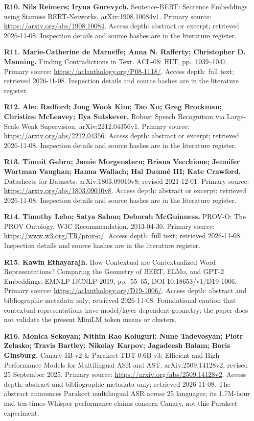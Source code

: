 \documentclass[
  10pt,
]{article}
\begin{document}
\textbf{R10. Nils Reimers; Iryna Gurevych.} Sentence-BERT: Sentence
Embeddings using Siamese BERT-Networks. arXiv:1908.10084v1. Primary
source: \url{https://arxiv.org/abs/1908.10084}. Access depth: abstract
or excerpt; retrieved 2026-11-08. Inspection details and source hashes
are in the literature register.

\textbf{R11. Marie-Catherine de Marneffe; Anna N. Rafferty; Christopher
D. Manning.} Finding Contradictions in Text. ACL-08: HLT,
pp.~1039--1047. Primary source:
\url{https://aclanthology.org/P08-1118/}. Access depth: full text;
retrieved 2026-11-08. Inspection details and source hashes are in the
literature register.

\textbf{R12. Alec Radford; Jong Wook Kim; Tao Xu; Greg Brockman;
Christine McLeavey; Ilya Sutskever.} Robust Speech Recognition via
Large-Scale Weak Supervision. arXiv:2212.04356v1. Primary source:
\url{https://arxiv.org/abs/2212.04356}. Access depth: abstract or
excerpt; retrieved 2026-11-08. Inspection details and source hashes are
in the literature register.

\textbf{R13. Timnit Gebru; Jamie Morgenstern; Briana Vecchione; Jennifer
Wortman Vaughan; Hanna Wallach; Hal Daumé III; Kate Crawford.}
Datasheets for Datasets. arXiv:1803.09010v8; revised 2021-12-01. Primary
source: \url{https://arxiv.org/abs/1803.09010v8}. Access depth: abstract
or excerpt; retrieved 2026-11-08. Inspection details and source hashes
are in the literature register.

\textbf{R14. Timothy Lebo; Satya Sahoo; Deborah McGuinness.} PROV-O: The
PROV Ontology. W3C Recommendation, 2013-04-30. Primary source:
\url{https://www.w3.org/TR/prov-o/}. Access depth: full text; retrieved
2026-11-08. Inspection details and source hashes are in the literature
register.

\textbf{R15. Kawin Ethayarajh.} How Contextual are Contextualized Word
Representations? Comparing the Geometry of BERT, ELMo, and GPT-2
Embeddings. EMNLP-IJCNLP 2019, pp.~55--65, DOI 10.18653/v1/D19-1006.
Primary source: \url{https://aclanthology.org/D19-1006/}. Access depth:
abstract and bibliographic metadata only; retrieved 2026-11-08.
Foundational caution that contextual representations have
model/layer-dependent geometry; the paper does not validate the present
MiniLM token means or clusters.

\textbf{R16. Monica Sekoyan; Nithin Rao Koluguri; Nune Tadevosyan; Piotr
Zelasko; Travis Bartley; Nikolay Karpov; Jagadeesh Balam; Boris
Ginsburg.} Canary-1B-v2 \& Parakeet-TDT-0.6B-v3: Efficient and
High-Performance Models for Multilingual ASR and AST.
arXiv:2509.14128v2, revised 25 September 2025. Primary source:
\url{https://arxiv.org/abs/2509.14128v2}. Access depth: abstract and
bibliographic metadata only; retrieved 2026-11-08. The abstract
announces Parakeet multilingual ASR across 25 languages; its 1.7M-hour
and ten-times-Whisper performance claims concern Canary, not this
Parakeet experiment.
\end{document}
